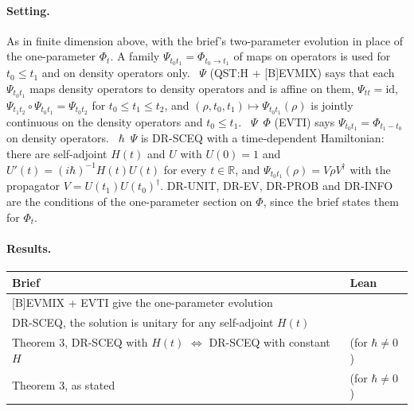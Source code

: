\documentclass[11pt]{article}
\begin{document}
\paragraph{Setting.} As in finite dimension above, with the brief's two-parameter evolution in
place of the one-parameter $\Phi_t$. A family $\Psi_{t_0 t_1} = \Phi_{t_0 \to t_1}$ of maps on
operators is used for $t_0 \le t_1$ and on density operators only.
~$\Psi$ (QST:H + [B]EVMIX) says that each $\Psi_{t_0 t_1}$ maps
density operators to density operators and is affine on them, $\Psi_{tt} = \mathrm{id}$,
$\Psi_{t_1 t_2} \circ \Psi_{t_0 t_1} = \Psi_{t_0 t_2}$ for $t_0 \le t_1 \le t_2$, and
$(\rho, t_0, t_1) \mapsto \Psi_{t_0 t_1}(\rho)$ is jointly continuous on the density operators and
$t_0 \le t_1$. ~$\Psi$~$\Phi$ (EVTI) says $\Psi_{t_0 t_1} =
\Phi_{t_1 - t_0}$ on density operators. ~$\hbar$~$\Psi$ is DR-SCEQ with a
time-dependent Hamiltonian: there are self-adjoint $H(t)$ and $U$ with $U(0) = 1$ and $U'(t) =
(i\hbar)^{-1}H(t)U(t)$ for every $t \in \mathbb{R}$, and $\Psi_{t_0 t_1}(\rho) = V\rho V^\dagger$
with the propagator $V = U(t_1)U(t_0)^\dagger$. DR-UNIT, DR-EV, DR-PROB and DR-INFO are the
conditions of the one-parameter section on $\Phi$, since the brief states them for $\Phi_t$.

\paragraph{Results.}
\begin{center}
\begin{tabularx}{\textwidth}{@{}BL@{}}
\toprule
Brief & Lean \\
\midrule
{[B]EVMIX} + EVTI give the one-parameter evolution &  \\
DR-SCEQ, the solution is unitary for any self-adjoint $H(t)$ &
   \\
Theorem 3, DR-SCEQ with $H(t)$ $\Leftrightarrow$ DR-SCEQ with constant $H$ &
   (for $\hbar \ne 0$) \\
Theorem 3, as stated &  (for $\hbar \ne 0$) \\
\bottomrule
\end{tabularx}
\end{center}
\end{document}
